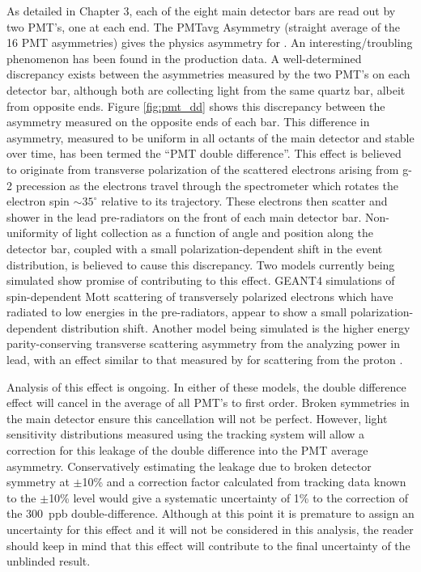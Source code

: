 As detailed in Chapter 3, each of the eight main detector bars are read out by two PMT's, one at each end. The PMTavg Asymmetry (straight average of the 16 PMT asymmetries) gives the physics asymmetry for \Q. An interesting/troubling phenomenon has been found in the \Qs production data. A well-determined discrepancy exists between the asymmetries measured by the two PMT's on each detector bar, although both are collecting light from the same quartz bar, albeit from opposite ends. Figure \ref{fig:pmt_dd} shows this discrepancy between the asymmetry measured on the opposite ends of each bar. This difference in asymmetry, measured to be uniform in all octants of the main detector and stable over time, has been termed the ``PMT double difference''. This effect is believed to originate from transverse polarization of the scattered electrons arising from g-2 precession as the electrons travel through the \qtor spectrometer which rotates the electron spin $\sim 35^{\circ}$ relative to its trajectory. These electrons then scatter and shower in the lead pre-radiators on the front of each main detector bar. Non-uniformity of light collection as a function of angle and position along the detector bar, coupled with a small polarization-dependent shift in the event distribution, is believed to cause this discrepancy. Two models currently being simulated show promise of contributing to this effect. GEANT4 simulations of spin-dependent Mott scattering of transversely polarized electrons which have radiated to low energies in the pre-radiators, appear to show a small polarization-dependent distribution shift. Another model being simulated is the higher energy parity-conserving transverse scattering asymmetry from the analyzing power in lead, with an effect similar to that measured by \Qs for scattering from the proton \cite{Waidyawansa}. 

Analysis of this effect is ongoing. In either of these models, the double difference effect will cancel in the average of all PMT's to first order. Broken symmetries in the main detector ensure this cancellation will not be perfect. However, light sensitivity distributions measured using the tracking system will allow a correction for this leakage of the double difference into the PMT average asymmetry. Conservatively estimating the leakage due to broken detector symmetry at $\pm$10\% and a correction factor calculated from tracking data known to the $\pm$10\% level would give a systematic uncertainty of 1\% to the correction of the 300~ppb double-difference. Although at this point it is premature to assign an uncertainty for this effect and it will not be considered in this analysis, the reader should keep in mind that this effect will contribute to the final uncertainty of the unblinded result.

